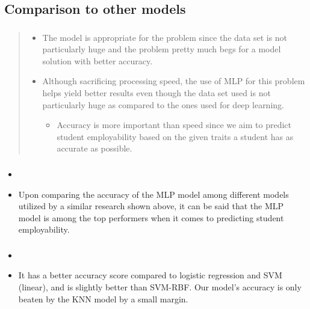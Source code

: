 \subsection{Comparison to other models}
\begin{frame}
\frametitle{\subsecname}
\begin{quote}
	\begin{itemize}
		\item The model is appropriate for the problem since the data set is not particularly huge and the problem pretty much begs for a model solution with better accuracy.
		\item Although sacrificing processing speed, the use of MLP for this problem helps yield better results even though the data set used is not particularly huge as compared to the ones used for deep learning.
		\begin{itemize}
			\item Accuracy is more important than speed since we aim to predict student employability based on the given traits a student has as accurate as possible.
		\end{itemize}
	\end{itemize}
\end{quote}
\end{frame}

\begin{frame}
\frametitle{\subsecname}
\begin{itemize}
	\item[] 
	\item Upon comparing the accuracy of the MLP model among different models utilized by a similar research shown above, it can be said that the MLP model is among the top performers when it comes to predicting student employability.
\end{itemize}
\end{frame}

\begin{frame}
\frametitle{\subsecname}
\begin{itemize}
	\item[] 
	\item It has a better accuracy score compared to logistic regression and SVM (linear), and is slightly better than SVM-RBF. Our model's accuracy is only beaten by the KNN model by a small margin.
\end{itemize}
\end{frame}
